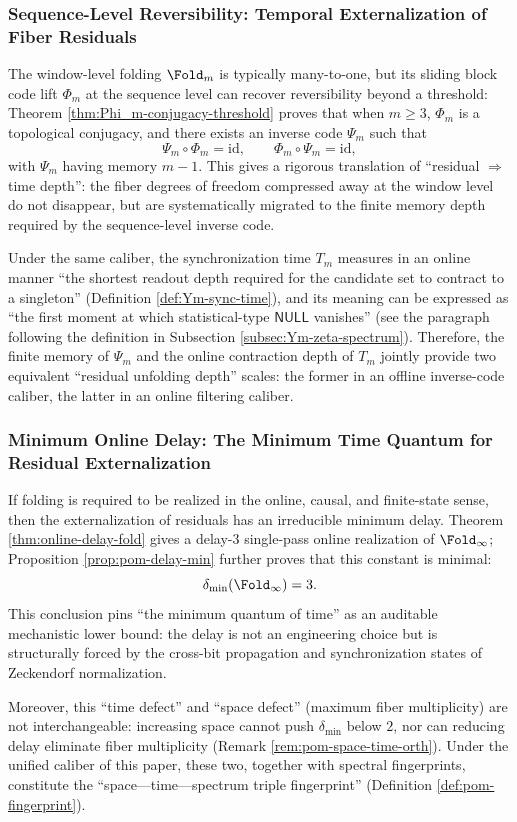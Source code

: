 \subsubsection{Sequence-Level Reversibility: Temporal Externalization of Fiber Residuals}\label{subsubsec:frt-sequence-inversion}
The window-level folding \(\Fold_m\) is typically many-to-one, but its sliding block code lift \(\Phi_m\) at the sequence level can recover reversibility beyond a threshold: Theorem \ref{thm:Phi_m-conjugacy-threshold} proves that when \(m\ge 3\), \(\Phi_m\) is a topological conjugacy, and there exists an inverse code \(\Psi_m\) such that
\[
\Psi_m\circ\Phi_m=\mathrm{id},\qquad \Phi_m\circ\Psi_m=\mathrm{id},
\]
with \(\Psi_m\) having memory \(m-1\). This gives a rigorous translation of ``residual \(\Rightarrow\) time depth'': the fiber degrees of freedom compressed away at the window level do not disappear, but are systematically migrated to the finite memory depth required by the sequence-level inverse code.\par
Under the same caliber, the synchronization time \(T_m\) measures in an online manner ``the shortest readout depth required for the candidate set to contract to a singleton'' (Definition \ref{def:Ym-sync-time}), and its meaning can be expressed as ``the first moment at which statistical-type \(\mathsf{NULL}\) vanishes'' (see the paragraph following the definition in Subsection \ref{subsec:Ym-zeta-spectrum}). Therefore, the finite memory of \(\Psi_m\) and the online contraction depth of \(T_m\) jointly provide two equivalent ``residual unfolding depth'' scales: the former in an offline inverse-code caliber, the latter in an online filtering caliber.

\subsubsection{Minimum Online Delay: The Minimum Time Quantum for Residual Externalization}\label{subsubsec:frt-min-online-delay}
If folding is required to be realized in the online, causal, and finite-state sense, then the externalization of residuals has an irreducible minimum delay. Theorem \ref{thm:online-delay-fold} gives a delay-3 single-pass online realization of \(\Fold_\infty\); Proposition \ref{prop:pom-delay-min} further proves that this constant is minimal:
\[
\delta_{\min}(\Fold_\infty)=3.
\]
This conclusion pins ``the minimum quantum of time'' as an auditable mechanistic lower bound: the delay is not an engineering choice but is structurally forced by the cross-bit propagation and synchronization states of Zeckendorf normalization.\par
Moreover, this ``time defect'' and ``space defect'' (maximum fiber multiplicity) are not interchangeable: increasing space cannot push \(\delta_{\min}\) below \(2\), nor can reducing delay eliminate fiber multiplicity (Remark \ref{rem:pom-space-time-orth}). Under the unified caliber of this paper, these two, together with spectral fingerprints, constitute the ``space---time---spectrum triple fingerprint'' (Definition \ref{def:pom-fingerprint}).

